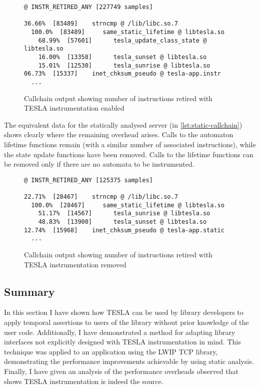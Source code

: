 \begin{figure}[ht]
  \begin{verbatim}
@ INSTR_RETIRED_ANY [227749 samples]

36.66%  [83489]    strncmp @ /lib/libc.so.7
  100.0%  [83489]     same_static_lifetime @ libtesla.so
    68.99%  [57601]      tesla_update_class_state @ libtesla.so
    16.00%  [13358]      tesla_sunset @ libtesla.so
    15.01%  [12530]      tesla_sunrise @ libtesla.so
06.73%  [15337]    inet_chksum_pseudo @ tesla-app.instr
  ...
  \end{verbatim}
  \caption{Callchain output showing number of instructions retired with
  TESLA instrumentation enabled}
  \label{lst:instr-callchain}
\end{figure}

The equivalent data for the statically analysed server (in
\autoref{lst:static-callchain}) shows clearly where the remaining
overhead arises. Calls to the automaton lifetime functions remain (with
a similar number of associated instructions), while the state update
functions have been removed. Calls to the lifetime functions can be
removed only if there are no automata to be instrumented.

\begin{figure}[ht]
  \begin{verbatim}
@ INSTR_RETIRED_ANY [125375 samples]

22.71%  [28467]    strncmp @ /lib/libc.so.7
  100.0%  [28467]     same_static_lifetime @ libtesla.so
    51.17%  [14567]      tesla_sunrise @ libtesla.so
    48.83%  [13900]      tesla_sunset @ libtesla.so
12.74%  [15968]    inet_chksum_pseudo @ tesla-app.static
  ...
  \end{verbatim}
  \caption{Callchain output showing number of instructions retired with
  TESLA instrumentation removed}
  \label{lst:static-callchain}
\end{figure}

\subsection{Summary}

In this section I have shown how TESLA can be used by library developers to
apply temporal assertions to users of the library without prior knowledge of the
user code. Additionally, I have demonstrated a method for adapting library
interfaces not explicitly designed with TESLA instrumentation in mind. This
technique was applied to an application using the LWIP TCP library,
demonstrating the performance improvements achievable by using static
analysis. Finally, I have given an analysis of the performance overheads
observed that shows TESLA instrumentation is indeed the source.

